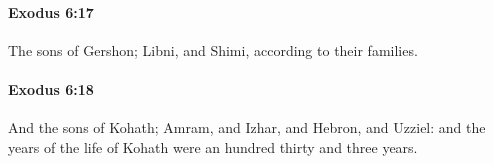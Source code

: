 		\paragraph{Exodus 6:17} %
			\label{EXODUS-6-17}

			The sons of Gershon; Libni, and Shimi, according to their families.


		\paragraph{Exodus 6:18} %
			\label{EXODUS-6-18}

			And the sons of Kohath; Amram, and Izhar, and Hebron, and Uzziel: and the years of the life of Kohath were an hundred thirty and three years.


